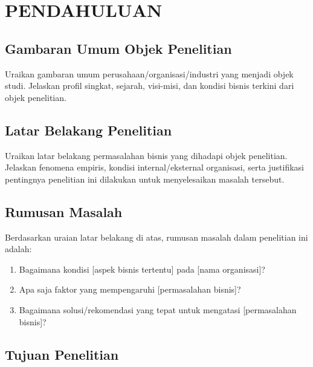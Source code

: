 
\chapter{PENDAHULUAN}
\label{bab:pendahuluan-pb}

\section{Gambaran Umum Objek Penelitian}
\label{sec:gambaran-umum-pb}

Uraikan gambaran umum perusahaan/organisasi/industri yang menjadi objek studi.
Jelaskan profil singkat, sejarah, visi-misi, dan kondisi bisnis terkini dari
objek penelitian.

\section{Latar Belakang Penelitian}
\label{sec:latar-belakang-pb}

Uraikan latar belakang permasalahan bisnis yang dihadapi objek penelitian.
Jelaskan fenomena empiris, kondisi internal/eksternal organisasi, serta justifikasi
pentingnya penelitian ini dilakukan untuk menyelesaikan masalah tersebut.

\section{Rumusan Masalah}
\label{sec:rumusan-masalah-pb}

Berdasarkan uraian latar belakang di atas, rumusan masalah dalam penelitian ini adalah:

\begin{enumerate}
  \item Bagaimana kondisi [aspek bisnis tertentu] pada [nama organisasi]?
  \item Apa saja faktor yang mempengaruhi [permasalahan bisnis]?
  \item Bagaimana solusi/rekomendasi yang tepat untuk mengatasi [permasalahan bisnis]?
\end{enumerate}

\section{Tujuan Penelitian}
\label{sec:tujuan-pb}

